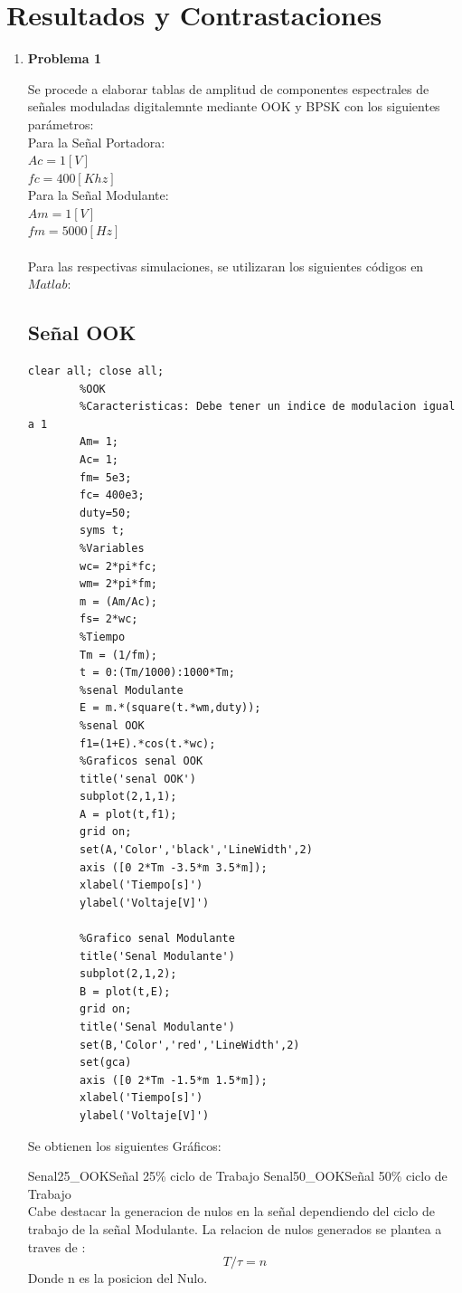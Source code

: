 \documentclass[letterpaper, titlepage]{article}
\begin{document}
\section{Resultados y Contrastaciones}
	\begin{enumerate}
		\item \textbf{Problema 1}
		
		Se procede a elaborar tablas de amplitud de componentes espectrales de señales moduladas digitalemnte mediante OOK y BPSK con los siguientes parámetros:\\
		Para la Señal Portadora:\\
		$Ac=1[V]$\\
		$fc=400[Khz]$\\
		Para la Señal Modulante:\\
		$Am=1[V]$\\
		$fm=5000[Hz]$\\\\
		Para las respectivas simulaciones, se utilizaran los siguientes códigos en $Matlab$:\\
		\subsection{Señal OOK}
		
		\begin{lstlisting}[label=some-code,caption=Codigo Matlab OOK]
		clear all; close all;
		%OOK
		%Caracteristicas: Debe tener un indice de modulacion igual a 1
		Am= 1;
		Ac= 1;
		fm= 5e3; 
		fc= 400e3;
		duty=50;
		syms t;
		%Variables
		wc= 2*pi*fc;
		wm= 2*pi*fm;
		m = (Am/Ac);
		fs= 2*wc;
		%Tiempo
		Tm = (1/fm);
		t = 0:(Tm/1000):1000*Tm;
		%senal Modulante
		E = m.*(square(t.*wm,duty));
		%senal OOK
		f1=(1+E).*cos(t.*wc);
		%Graficos senal OOK
		title('senal OOK')
		subplot(2,1,1);
		A = plot(t,f1);
		grid on;
		set(A,'Color','black','LineWidth',2)
		axis ([0 2*Tm -3.5*m 3.5*m]);
		xlabel('Tiempo[s]')
		ylabel('Voltaje[V]')

		%Grafico senal Modulante
		title('Senal Modulante')
		subplot(2,1,2);
		B = plot(t,E);
		grid on;
		title('Senal Modulante')
		set(B,'Color','red','LineWidth',2)
		set(gca)
		axis ([0 2*Tm -1.5*m 1.5*m]);
		xlabel('Tiempo[s]')
		ylabel('Voltaje[V]')
		\end{lstlisting}
		\newpage
		Se obtienen los siguientes Gráficos:
		
			{Senal25_OOK}{\label{fig:sim}}{Señal 25\% ciclo de Trabajo}
			{Senal50_OOK}{\label{fig:sim}}{Señal 50\% ciclo de Trabajo}
			\\
			Cabe destacar la generacion de nulos en la señal dependiendo del ciclo de trabajo de la señal Modulante. La relacion de nulos generados se plantea a traves de :
			\begin{equation}
			T/\tau =n
			\end{equation}
			Donde n es la posicion del Nulo.\\\\
			

\end{enumerate}
\end{document}
